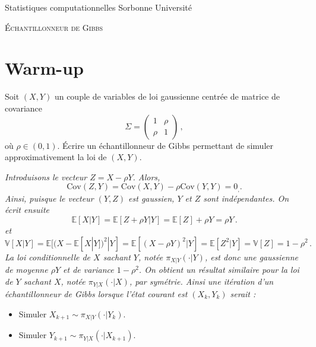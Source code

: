 \documentclass[a4paper,10pt,fleqn]{article}
\newcommand{\1}{\ensuremath{\mathbbm{1}}}
\begin{document}
\noindent Statistiques computationnelles \hfill Sorbonne Universit\'e 

\noindent\hrulefill

\begin{center}
\textsc{\'Echantillonneur de Gibbs}
\end{center}
\hrulefill

\medskip


\section*{Warm-up}
Soit $(X,Y)$ un couple de variables de loi gaussienne centr\'ee de matrice de covariance 
$$
\Sigma = \begin{pmatrix}
1 & \rho\\ \rho & 1
\end{pmatrix}\,,
$$
o\`u $\rho \in(0,1)$. 
\'Ecrire un \'echantillonneur de Gibbs permettant de simuler approximativement la loi de $(X,Y)$.

\vspace{.2cm}

{\em
Introduisons le vecteur $Z = X-\rho Y$. Alors, 
$$
\mathrm{Cov}(Z,Y) = \mathrm{Cov}(X,Y) - \rho\mathrm{Cov}(Y,Y) = 0_,.
$$
Ainsi, puisque le vecteur $(Y,Z)$ est gaussien, $Y$ et $Z$ sont ind\'ependantes. On \'ecrit ensuite 
$$
\mathbb{E}[X|Y] = \mathbb{E}[Z+\rho Y|Y] = \mathbb{E}[Z] +\rho Y = \rho Y\,.
$$
et
$$
\mathbb{V}[X|Y] = \mathbb{E}[(X- \mathbb{E}[X|Y])^2|Y] =\mathbb{E}[(X- \rho Y)^2|Y] = \mathbb{E}[Z^2|Y] = \mathbb{V}[Z] = 1-\rho^2\,.
$$
La loi conditionnelle de $X$ sachant $Y$, not\'ee $\pi_{X|Y}(\cdot |Y)$, est donc une gaussienne de moyenne $\rho Y$ et de variance $1-\rho^2$. On obtient un r\'esultat similaire pour la loi de $Y$ sachant $X$, not\'ee $\pi_{Y|X}(\cdot |X)$, par sym\'etrie. Ainsi une it\'eration d'un \'echantillonneur de Gibbs  lorsque l'\'etat courant est $(X_k,Y_k)$ serait :
\begin{itemize}
\item Simuler $X_{k+1} \sim \pi_{X|Y}(\cdot |Y_k)$.
\item Simuler $Y_{k+1} \sim \pi_{Y|X}(\cdot |X_{k+1})$.
\end{itemize}
}
\end{document}
